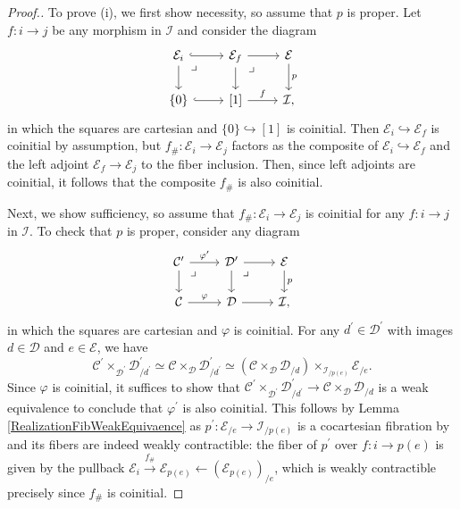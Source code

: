 \documentclass[a4paper,reqno,10pt]{amsart}
\theoremstyle{definition}
\theoremstyle{remark}
\newcommand{\sqb}[1]{\left\lbrack #1\right\rbrack}
\newcommand{\C}{\mathcal{C}}
\newcommand{\D}{\mathcal{D}}
\newcommand{\E}{\mathcal{E}}
\newcommand{\I}{\mathcal{I}}
\begin{document}
\begin{proof}[Proof.]
To prove (i), we first show necessity, so assume that $p$ is proper. Let $f\colon i\rightarrow j$ be any morphism in $\I$ and consider the diagram
\begin{equation*}
\begin{tikzcd}
\E_i\arrow[r,hookrightarrow]\arrow[d]\arrow[dr,very near start,phantom,"\lrcorner"] & \E_f\arrow[r]\arrow[d]\arrow[dr,very near start,phantom,"\lrcorner"] & \E\arrow[d,"p"]\\
\{0\}\arrow[r,hookrightarrow] & \sqb{1}\arrow[r,"f"] & \I,
\end{tikzcd}
\end{equation*}
in which the squares are cartesian and $\{0\}\hookrightarrow\sqb{1}$ is coinitial. Then $\E_i\hookrightarrow\E_f$ is coinitial by assumption, but $f_{\#}\colon\E_i\rightarrow\E_j$ factors as the composite of $\E_i\hookrightarrow\E_f$ and the left adjoint $\E_f\rightarrow\E_j$ to the fiber inclusion. Then, since left adjoints are coinitial, it follows that the composite $f_{\#}$ is also coinitial.

Next, we show sufficiency, so assume that $f_{\#}\colon\E_i\rightarrow\E_j$ is coinitial for any $f\colon i\rightarrow j$ in $\I$. To check that $p$ is proper, consider any diagram
\begin{equation*}
\begin{tikzcd}
\C^{\prime}\arrow[r,"\varphi^{\prime}"]\arrow[d]\arrow[dr,very near start,phantom,"\lrcorner"] & \D^{\prime}\arrow[r]\arrow[d]\arrow[dr,very near start,phantom,"\lrcorner"] & \E\arrow[d,"p"]\\
\C\arrow[r,"\varphi"] & \D\arrow[r] & \I,
\end{tikzcd}
\end{equation*}
in which the squares are cartesian and $\varphi$ is coinitial. For any $d^{\prime}\in\D^{\prime}$ with images $d\in\D$ and $e\in\E$, we have
\begin{equation*}
\C^{\prime}\times_{\D^{\prime}}\D^{\prime}_{/d^{\prime}}\simeq\C\times_{\D}\D^{\prime}_{/d^{\prime}}\simeq(\C\times_{\D}\D_{/d})\times_{\I_{/p(e)}}\E_{/e}.
\end{equation*}
Since $\varphi$ is coinitial, it suffices to show that $\C^{\prime}\times_{\D^{\prime}}\D^{\prime}_{/d^{\prime}}\rightarrow\C\times_{\D}\D_{/d}$ is a weak equivalence to conclude that $\varphi^{\prime}$ is also coinitial. This follows by Lemma \ref{RealizationFibWeakEquivaence} as $p^{\prime}\colon\E_{/e}\rightarrow\I_{/p(e)}$ is a cocartesian fibration by \cite[\href{https://kerodon.net/tag/0477}{Tag 0477}]{kerodon} and its fibers are indeed weakly contractible: the fiber of $p^{\prime}$ over $f\colon i\rightarrow p(e)$ is given by the pullback $\E_i\stackrel{f_{\#}}{\rightarrow}\E_{p(e)}\leftarrow(\E_{p(e)})_{/e}$, which is weakly contractible precisely since $f_{\#}$ is coinitial.


\end{proof}
\end{document}
